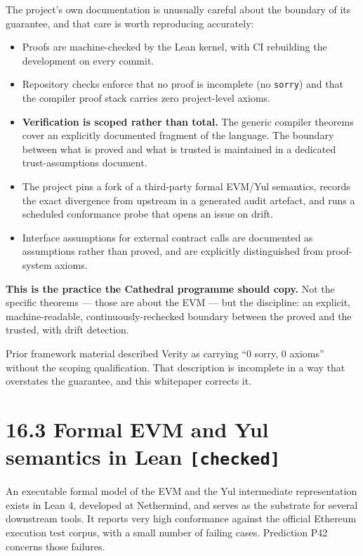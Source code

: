 \documentclass[
  11pt]{report}
\providecommand{\tightlist}{%
  \setlength{\itemsep}{0pt}\setlength{\parskip}{0pt}}
\begin{document}
The project's own documentation is unusually careful about the boundary
of its guarantee, and that care is worth reproducing accurately:

\begin{itemize}
\tightlist
\item
  Proofs are machine-checked by the Lean kernel, with CI rebuilding the
  development on every commit.
\item
  Repository checks enforce that no proof is incomplete (no
  \texttt{sorry}) and that the compiler proof stack carries zero
  project-level axioms.
\item
  \textbf{Verification is scoped rather than total.} The generic
  compiler theorems cover an explicitly documented fragment of the
  language. The boundary between what is proved and what is trusted is
  maintained in a dedicated trust-assumptions document.
\item
  The project pins a fork of a third-party formal EVM/Yul semantics,
  records the exact divergence from upstream in a generated audit
  artefact, and runs a scheduled conformance probe that opens an issue
  on drift.
\item
  Interface assumptions for external contract calls are documented as
  assumptions rather than proved, and are explicitly distinguished from
  proof-system axioms.
\end{itemize}

\textbf{This is the practice the Cathedral programme should copy.} Not
the specific theorems --- those are about the EVM --- but the
discipline: an explicit, machine-readable, continuously-rechecked
boundary between the proved and the trusted, with drift detection.

Prior framework material described Verity as carrying ``0 sorry, 0
axioms'' without the scoping qualification. That description is
incomplete in a way that overstates the guarantee, and this whitepaper
corrects it.

\hypertarget{formal-evm-and-yul-semantics-in-lean-checked}{%
\section{\texorpdfstring{16.3 Formal EVM and Yul semantics in Lean
\texttt{{[}checked{]}}}{16.3 Formal EVM and Yul semantics in Lean {[}checked{]}}}\label{formal-evm-and-yul-semantics-in-lean-checked}}

An executable formal model of the EVM and the Yul intermediate
representation exists in Lean 4, developed at Nethermind, and serves as
the substrate for several downstream tools. It reports very high
conformance against the official Ethereum execution test corpus, with a
small number of failing cases. Prediction P42 concerns those failures.
\end{document}
